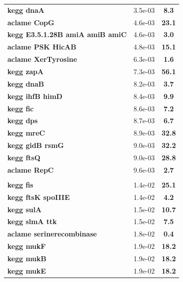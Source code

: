 \begin{landscape}
\begin{table}
{\begin{minipage}[t]{0.3\textwidth}
\begin{tabular}{>{\bfseries}p{\textwidth}cc}
\rowcolor{posit}kegg dnaA&3.5e-03&\textbf{\colorbox{colorpowerxx}{8.3}}\\
\rowcolor{posit}aclame CopG&4.6e-03&\textbf{\colorbox{colorpowerxxx}{23.1}}\\
\rowcolor{posit}kegg E3.5.1.28B amiA amiB amiC&4.6e-03&\textbf{\colorbox{colorpowerx}{3.0}}\\
\rowcolor{posit}aclame PSK HicAB&4.8e-03&\textbf{\colorbox{colorpowerxx}{15.1}}\\
\rowcolor{posit}aclame XerTyrosine&6.3e-03&\textbf{\colorbox{colorpower}{1.6}}\\
\rowcolor{posit}kegg zapA&7.3e-03&\textbf{\colorbox{colorpowerxxxx}{56.1}}\\
\rowcolor{posit}kegg dnaB&8.2e-03&\textbf{\colorbox{colorpowerx}{3.7}}\\
\rowcolor{posit}kegg ihfB himD&8.4e-03&\textbf{\colorbox{colorpowerxx}{9.9}}\\
\rowcolor{posit}kegg fic&8.6e-03&\textbf{\colorbox{colorpowerx}{7.2}}\\
\rowcolor{posit}kegg dps&8.7e-03&\textbf{\colorbox{colorpowerx}{6.7}}\\
\rowcolor{posit}kegg mreC&8.9e-03&\textbf{\colorbox{colorpowerxxx}{32.8}}\\
\rowcolor{posit}kegg gidB rsmG&9.0e-03&\textbf{\colorbox{colorpowerxxx}{32.2}}\\
\rowcolor{posit}kegg ftsQ&9.0e-03&\textbf{\colorbox{colorpowerxxx}{28.8}}\\
\rowcolor{posit}aclame RepC&9.6e-03&\textbf{\colorbox{colorpowerx}{2.7}}\\
\\
\rowcolor{posit2}kegg fis&1.4e-02&\textbf{\colorbox{colorpowerxxx}{25.1}}\\
\rowcolor{posit2}kegg ftsK spoIIIE&1.4e-02&\textbf{\colorbox{colorpowerx}{4.2}}\\
\rowcolor{posit2}kegg sulA&1.5e-02&\textbf{\colorbox{colorpowerxx}{10.7}}\\
\rowcolor{posit2}kegg slmA ttk&1.5e-02&\textbf{\colorbox{colorpowerxx}{7.5}}\\
\rowcolor{posit2}aclame serinerecombinase&1.8e-02&\textbf{\colorbox{colorpowerneg}{0.4}}\\
\rowcolor{posit2}kegg mukF&1.9e-02&\textbf{\colorbox{colorpowerxx}{18.2}}\\
\rowcolor{posit2}kegg mukB&1.9e-02&\textbf{\colorbox{colorpowerxx}{18.2}}\\
\rowcolor{posit2}kegg mukE&1.9e-02&\textbf{\colorbox{colorpowerxx}{18.2}}\\

\end{tabular}
\end{minipage}}
\end{table}
\end{landscape}
